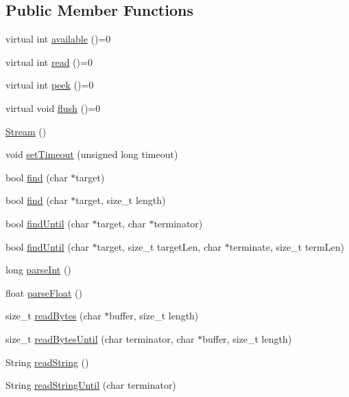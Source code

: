 \subsection*{Public Member Functions}
\begin{DoxyCompactItemize}
\item 
virtual int \hyperlink{class_stream_a9c98a763395005c08ce95afb2f06c7b1}{available} ()=0
\item 
virtual int \hyperlink{class_stream_aea5dee9fcb038148515b7c9212d38dc0}{read} ()=0
\item 
virtual int \hyperlink{class_stream_a30c3c212ec6ea67277a708c5ea2501a5}{peek} ()=0
\item 
virtual void \hyperlink{class_stream_aa3ef2c34f152a0b2ea8de9139b9461da}{flush} ()=0
\item 
\hyperlink{class_stream_a8c3f05bd00361ec92627fa41f330a39b}{Stream} ()
\item 
void \hyperlink{class_stream_a851dd6dc74d52389de04f99648478db5}{set\-Timeout} (unsigned long timeout)
\item 
bool \hyperlink{class_stream_a4bab30ccd324efd461dee46a2339f673}{find} (char $\ast$target)
\item 
bool \hyperlink{class_stream_ad851401f2318cdb1de05707e021b81d9}{find} (char $\ast$target, size\-\_\-t length)
\item 
bool \hyperlink{class_stream_ad1f5f6600832396fb38a897baf4de35b}{find\-Until} (char $\ast$target, char $\ast$terminator)
\item 
bool \hyperlink{class_stream_a3a9497de614792103ab8cb4759e01a69}{find\-Until} (char $\ast$target, size\-\_\-t target\-Len, char $\ast$terminate, size\-\_\-t term\-Len)
\item 
long \hyperlink{class_stream_a497ffcbcb4d5bb889a8fde487bcc1b98}{parse\-Int} ()
\item 
float \hyperlink{class_stream_a5e5a0cc11eb586d89dcb7fa8e53a87e8}{parse\-Float} ()
\item 
size\-\_\-t \hyperlink{class_stream_a45fd1336a323ea83b16e8507055f44ea}{read\-Bytes} (char $\ast$buffer, size\-\_\-t length)
\item 
size\-\_\-t \hyperlink{class_stream_af84672a4fb2620466958d3118d4fea00}{read\-Bytes\-Until} (char terminator, char $\ast$buffer, size\-\_\-t length)
\item 
String \hyperlink{class_stream_a1c60bdda2b65d78e5a1362d51b856c5a}{read\-String} ()
\item 
String \hyperlink{class_stream_a6a409da87c552909260d8cc428c5ca70}{read\-String\-Until} (char terminator)
\end{DoxyCompactItemize}
